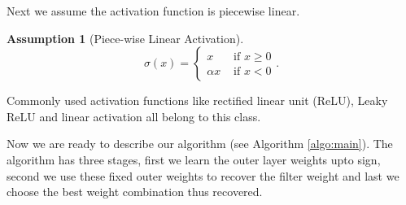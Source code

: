 \documentclass[11pt]{article}
\newcommand{\vect}[1]{\mathbf{#1}}
\newcommand{\norm}[1]{\left\|#1\right\|}
\newcommand{\abs}[1]{\left|#1\right|}
\newtheorem{asmp}{Assumption}[section]
\begin{document}
Next we assume the activation function is piecewise linear. 
\begin{asmp}[Piece-wise Linear Activation]
  \label{asmp:activation}
  \[\sigma(x) = \begin{cases}
  x &\text{ if } x \ge 0\\
  \alpha x &\text{ if } x < 0
  \end{cases}.
  \]
\end{asmp}
Commonly used activation functions like rectified linear unit (ReLU), Leaky ReLU and linear activation all belong to this class.

Now we are ready to describe our algorithm (see Algorithm \ref{algo:main}). The algorithm has three stages, first we learn the outer layer weights upto sign, second we use these fixed outer weights to recover the filter weight and last we choose the best weight combination thus recovered.
\end{document}
